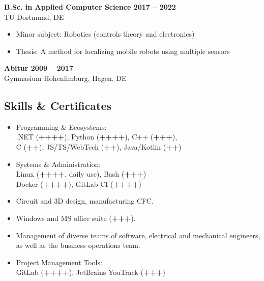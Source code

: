 \documentclass[a4paper,11pt]{article}
\newcommand{\subsectionskip}[0]{\vspace{0.125cm}}
\newcommand{\col}[2]{\textcolor[HTML]{#1}{#2}}
\begin{document}
\begin{minipage}[t]{0.65\textwidth}
    \subsectionskip

    \col{81879c}{\textbf{B.Sc. in Applied Computer Science \hfill 2017 -- 2022}} \\
    TU Dortmund, DE
    \begin{itemize}
        \small
        \item Minor subject: Robotics (controls theory and electronics)
        \item Thesis: A method for localizing mobile robots using multiple sensors
    \end{itemize}

    \subsectionskip

    \col{81879c}{\textbf{Abitur \hfill 2009 -- 2017}} \\
    Gymnasium Hohenlimburg, Hagen, DE

    \vspace{-0.5cm} %

    \begin{minipage}[t]{0.625\textwidth}
        \col{7690bb}{\section*{Skills \& Certificates}}
        \begin{itemize}
            \small
            \item Programming \& Ecosystems:\\
            .NET (\textbf{++++}), Python (\textbf{++++}), C++ (\textbf{+++}),\\
            C (\textbf{++}), JS/TS/WebTech (\textbf{++}), Java/Kotlin (\textbf{++})

            \item Systems \& Administration:\\
            Linux (\textbf{++++}, daily use), Bash (\textbf{+++}) \\
            Docker (\textbf{++++}), GitLab CI (\textbf{++++})

            \item Circuit and 3D design, manufacturing CFC.

            \item Windows and MS office suite (\textbf{+++}).

            \item Management of diverse teams of software, electrical and mechanical engineers, as well as the business operations team.

            \item Project Management Tools:\\
            GitLab (\textbf{++++}), JetBrains YouTrack (\textbf{+++})


\end{itemize}
\end{minipage}
\end{minipage}
\end{document}
